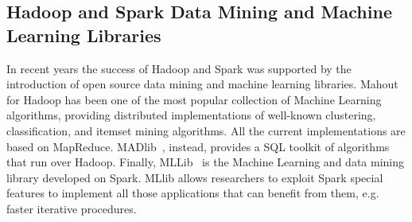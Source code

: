 \subsection{Hadoop and Spark Data Mining and Machine Learning Libraries}
In recent years the success of Hadoop and Spark was supported by the introduction of open
source data mining and machine learning libraries.
Mahout~\cite{Mahout} for Hadoop has been one of the most popular
collection of Machine Learning algorithms, providing distributed implementations of well-known clustering, classification, and itemset mining algorithms.
All the current implementations are based on MapReduce.
MADlib~\cite{madlib}, instead, provides a SQL toolkit of algorithms that run over Hadoop. Finally,
MLLib~\cite{MLLib} is the Machine Learning and data mining library developed on Spark. MLlib allows researchers to exploit Spark special features
to implement all those applications that can benefit from them, e.g. faster iterative procedures.
